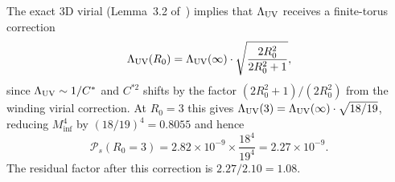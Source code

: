 \begin{proposition}
\label{P7:prop:seesaw_correction}
The exact 3D virial (Lemma~3.2 of~\cite{Paper4}) implies that $\Lambda_{\mathrm{UV}}$
receives a finite-torus correction
\begin{equation}
  \Lambda_{\mathrm{UV}}(R_0) = \Lambda_{\mathrm{UV}}(\infty)\cdot\sqrt{\frac{2R_0^2}{2R_0^2+1}},
  \label{P7:eq:LUV_correction}
\end{equation}
since $\Lambda_{\mathrm{UV}}\sim 1/C^*$ and $C^{*2}$ shifts by the factor
$(2R_0^2+1)/(2R_0^2)$ from the winding virial correction.
At $R_0=3$ this gives $\Lambda_{\mathrm{UV}}(3)=\Lambda_{\mathrm{UV}}(\infty)\cdot\sqrt{18/19}$,
reducing $M_{\mathrm{inf}}^4$ by $(18/19)^4=0.8055$ and hence
\begin{equation}
  \mathcal{P}_s(R_0=3) = 2.82\times10^{-9}\times\frac{18^4}{19^4}
  = 2.27\times10^{-9}.
  \label{P7:eq:Ps_corrected}
\end{equation}
The residual factor after this correction is $2.27/2.10 = 1.08$.
\end{proposition}

